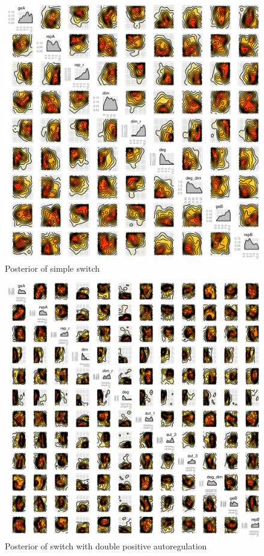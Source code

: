 \begin{figure}[htbp]
\begin{center}
\includegraphics[scale=0.15]{chapterStabilityFinder/mass_action_switches/bi_stoch_images/posterior_std.png}
\caption{Posterior of simple switch}\label{fig_6}
\end{center}
\end{figure}

\begin{figure}[htbp]
\begin{center}
\includegraphics[scale=0.15]{chapterStabilityFinder/mass_action_switches/bi_tri_same_priors/posterior_pos_ab_bi.png}
\caption{Posterior of switch with double positive autoregulation}\label{fig_7}
\end{center}
\end{figure}


